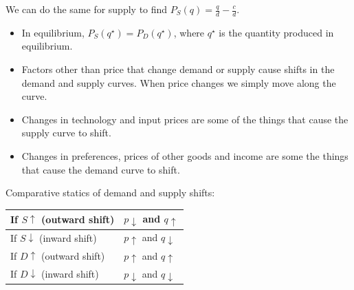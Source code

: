 \documentclass{article}
\begin{document}
We can do the same for supply to find $P_S\left( q \right)=\frac{q}{d}-\frac{c}{d}$.
\begin{itemize}
  \item In equilibrium, $P_S\left( q^\star \right)=P_D\left( q^\star \right)$,
    where $q^\star$ is the quantity produced in equilibrium.
  \item Factors other than price that change demand or supply cause shifts in the demand and supply curves. When price changes we simply move along the curve.
  \item Changes in technology and input prices are some of the things that cause the supply curve to shift.
  \item Changes in preferences, prices of other goods and income are some the things that cause the demand curve to shift.
\end{itemize}
Comparative statics of demand and supply shifts:
\begin{center}
  \begin{tabular}{|l|l|}\hline
    If $S\uparrow$ (outward shift)& $p\downarrow$ and $q\uparrow$ \\\hline
    If $S\downarrow$ (inward shift)& $p\uparrow$ and $q\downarrow$ \\\hline
    If $D\uparrow$ (outward shift)& $p\uparrow$ and $q\uparrow$ \\\hline
    If $D\downarrow$ (inward shift) & $p\downarrow$ and $q\downarrow$ \\\hline
  \end{tabular}
\end{center}
\end{document}
